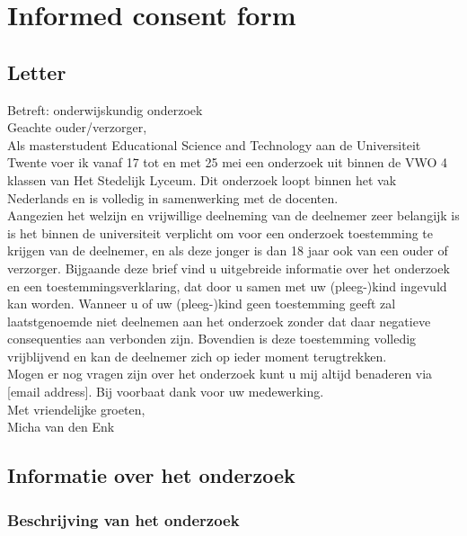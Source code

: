 \chapter{Informed consent form}
\label{app:consentform}

\section{Letter}

Betreft: onderwijskundig onderzoek \\[2ex]
Geachte ouder/verzorger, \\[2ex]
 
 
Als masterstudent Educational Science and Technology aan de Universiteit Twente voer ik vanaf 17 tot en met 25 mei een onderzoek uit binnen de VWO 4 klassen van Het Stedelijk Lyceum. Dit onderzoek loopt binnen het vak Nederlands en is volledig in samenwerking met de docenten. \\[2ex]
Aangezien het welzijn en vrijwillige deelneming van de deelnemer zeer belangijk is is het binnen de universiteit verplicht om voor een onderzoek toestemming te krijgen van de deelnemer, en als deze jonger is dan 18 jaar ook van een ouder of verzorger. Bijgaande deze brief vind u uitgebreide informatie over het onderzoek en een toestemmingsverklaring, dat door u samen met uw (pleeg-)kind ingevuld kan worden. Wanneer u of uw (pleeg-)kind geen toestemming geeft zal laatstgenoemde niet deelnemen aan het onderzoek zonder dat daar negatieve consequenties aan verbonden zijn. Bovendien is deze toestemming volledig vrijblijvend en kan de deelnemer zich op ieder moment terugtrekken. \\[2ex]
Mogen er nog vragen zijn over het onderzoek kunt u mij altijd benaderen via [email address]. Bij voorbaat dank voor uw medewerking. \\[2ex]
 
 
Met vriendelijke groeten, \\[2ex]
Micha van den Enk
 
\cleardoublepage
\cleardoublepage

\section{Informatie over het onderzoek}

\subsection{Beschrijving van het onderzoek}

